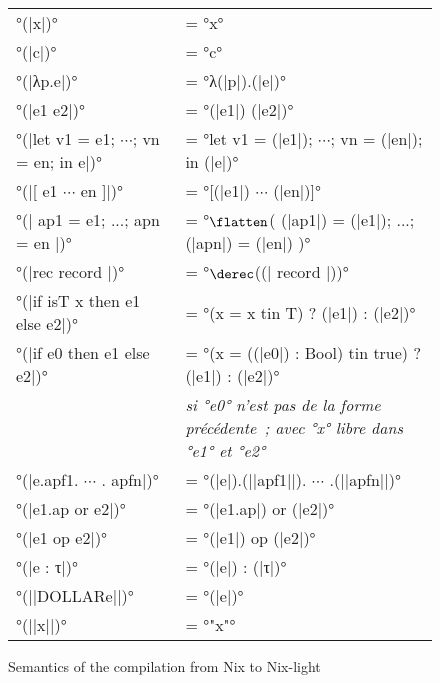 \begin{figure}
  \begin{tabular}{ll}
    °(|x|)° &= °x° \\
    °(|c|)° &= °c°\\
    °(|λp.e|)° &= °λ(|p|).(|e|)°\\
    °(|e1 e2|)° &= °(|e1|) (|e2|)°\\
    °(|let v1 = e1; $\cdots$; vn = en; in e|)° &=
      °let v1 = (|e1|); $\cdots$; vn = (|en|); in (|e|)°\\
    °(|[ e1 $\cdots$ en ]|)° &= °[(|e1|) $\cdots$ (|en|)]°\\
    °(|{ ap1 = e1; ...; apn = en }|)° &= °$\flatten$({ (|ap1|) = (|e1|); ...; (|apn|) = (|en|) })°\\
    °(|rec { record }|)° &= °$\derec$((|{ record }|))°\\
    °(|if isT x then e1 else e2|)° &= °(x = x tin T) ? (|e1|) : (|e2|)°\\
    °(|if e0 then e1 else e2|)° &=
      °(x = ((|e0|) : Bool) tin true) ? (|e1|) : (|e2|)°\\
    &{\itshape
      si °e0° n'est pas de la forme précédente ;
      avec °x° libre dans °e1° et °e2°}\\
    °(|e.apf1. $\cdots$ . apfn|)° &= °(|e|).(||apf1||). $\cdots$ .(||apfn||)°\\
    °(|e1.ap or e2|)° &= °(|e1.ap|) or (|e2|)°\\
    °(|e1 op e2|)° &= °(|e1|) op (|e2|)°\\
    °(|e : τ|)° &= °(|e|) : (|τ|)°\\

    °(||DOLLAR{e}||)° &= °(|e|)°\\
    °(||x||)° &= °"x"°
  \end{tabular}
  \caption{Semantics of the compilation from Nix to Nix-light}\label{nix-light::compilation}
\end{figure}

